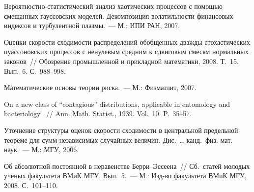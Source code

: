 \begin{multicols}{2}
{{\begin{thebibliography}{9}
Вероятностно-статистический анализ
хаотических процессов с помощью смешанных гауссовских моделей.
Декомпозиция волатильности финансовых индексов и турбулентной
плазмы.~--- М.: ИПИ РАН, 2007. %

Оценки скорости сходимости
распределений обобщенных дважды стохастических пуассоновских
процессов с ненулевым средним к сдвиговым смесям нормальных
законов~// Обозрение промышленной и прикладной
математики, 2008. Т.~15. Вып.~6. С.~988--998. %

Математические основы теории риска.~--- М.: Физматлит, 2007. %

On a new class of ``contagious'' distributions, applicable in
entomology and bacteriology~ // Ann. Math. Statist., 1939. Vol.~10. P.~35--57. %

Уточнение структуры оценок ско\-рости сходимости в
центральной предельной теореме для сумм независимых случайных
величин. Дис.\ \ldots %
канд.\ физ.-мат. наук.~--- М.: МГУ, 2006. %

 \label{end\stat}

Об абсолютной постоянной в неравенстве
Берри--Эссеена~// Сб.\ статей молодых ученых факультета ВМиК
МГУ. Вып.~5.~--- М.: Изд-во факультета ВМиК МГУ, 2008. С.~101--110. %



\end{thebibliography}
}
}
\end{multicols}  
 